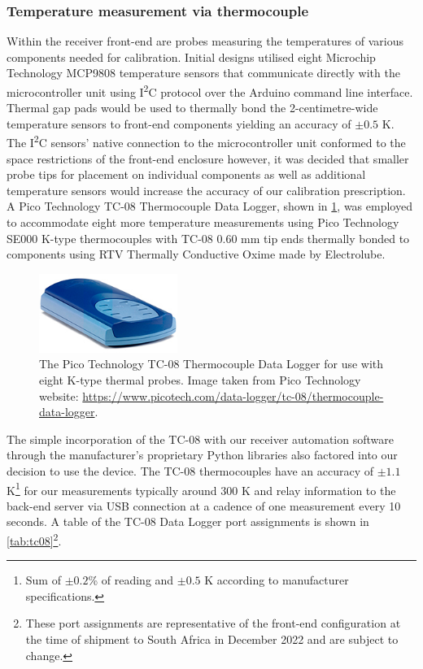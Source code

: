 \subsubsection{Temperature measurement via thermocouple}
Within the receiver front-end are probes measuring the temperatures of various components needed for calibration. Initial designs utilised eight Microchip Technology MCP9808 temperature sensors that communicate directly with the microcontroller unit using I\textsuperscript{2}C protocol over the Arduino command line interface. Thermal gap pads would be used to thermally bond the 2-centimetre-wide temperature sensors to front-end components yielding an accuracy of $\pm 0.5$ K. The I\textsuperscript{2}C sensors’ native connection to the microcontroller unit conformed to the space restrictions of the front-end enclosure however, it was decided that smaller probe tips for placement on individual components as well as additional temperature sensors would increase the accuracy of our calibration prescription. A Pico Technology TC-08 Thermocouple Data Logger, shown in \cref{fig:tc08}, was employed to accommodate eight more temperature measurements using Pico Technology SE000 K-type thermocouples with TC-08 0.60 mm tip ends thermally bonded to components using RTV Thermally Conductive Oxime made by Electrolube.
\begin{figure}
    \centering
    \includegraphics[width=0.4\textwidth]{tc08}
    \caption{The Pico Technology TC-08 Thermocouple Data Logger for use with eight K-type thermal probes. Image taken from Pico Technology website: \url{https://www.picotech.com/data-logger/tc-08/thermocouple-data-logger}.}
    \label{fig:tc08}
\end{figure}
The simple incorporation of the TC-08 with our receiver automation software through the manufacturer’s proprietary Python libraries also factored into our decision to use the device. The TC-08 thermocouples have an accuracy of $\pm 1.1$ K\footnote{Sum of $\pm0.2$\% of reading and $\pm0.5$ K according to manufacturer specifications.} for our measurements typically around 300 K and relay information to the back-end server via USB connection at a cadence of one measurement every 10 seconds. A table of the TC-08 Data Logger port assignments is shown in \cref{tab:tc08}\footnote{These port assignments are representative of the front-end configuration at the time of shipment to South Africa in December 2022 and are subject to change.}.
